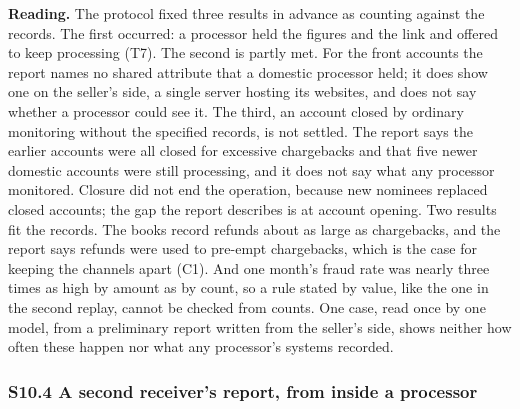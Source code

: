 \documentclass[
  11pt,
]{article}
\begin{document}
\textbf{Reading.} The protocol fixed three results in advance as
counting against the records. The first occurred: a processor held the
figures and the link and offered to keep processing (T7). The second is
partly met. For the front accounts the report names no shared attribute
that a domestic processor held; it does show one on the seller's side, a
single server hosting its websites, and does not say whether a processor
could see it. The third, an account closed by ordinary monitoring
without the specified records, is not settled. The report says the
earlier accounts were all closed for excessive chargebacks and that five
newer domestic accounts were still processing, and it does not say what
any processor monitored. Closure did not end the operation, because new
nominees replaced closed accounts; the gap the report describes is at
account opening. Two results fit the records. The books record refunds
about as large as chargebacks, and the report says refunds were used to
pre-empt chargebacks, which is the case for keeping the channels apart
(C1). And one month's fraud rate was nearly three times as high by
amount as by count, so a rule stated by value, like the one in the
second replay, cannot be checked from counts. One case, read once by one
model, from a preliminary report written from the seller's side, shows
neither how often these happen nor what any processor's systems
recorded.

\hypertarget{s10.4-a-second-receivers-report-from-inside-a-processor}{%
\subsubsection{S10.4 A second receiver's report, from inside a
processor}\label{s10.4-a-second-receivers-report-from-inside-a-processor}}
\end{document}
